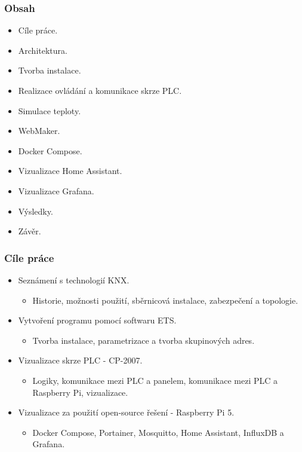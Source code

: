 \documentclass[%
  12pt,       				%
	t,                  %
	aspectratio=1610,   %
	unicode,						%
]{beamer}				    	%
\begin{document}
\disablenavigationsymbols

\maketitle

\begin{frame} 
	\frametitle{Obsah}
	\begin{itemize}
			\item Cíle práce.
			\item Architektura.
			\item Tvorba instalace.
			\item Realizace ovládání a komunikace skrze PLC.
			\item Simulace teploty.
			\item WebMaker.
			\item Docker Compose.
			\item Vizualizace Home Assistant.
			\item Vizualizace Grafana.
			\item Výsledky.
			\item Závěr.
	\end{itemize}
\end{frame}

\begin{frame} 
	\frametitle{Cíle práce}
	\begin{itemize}
			\item Seznámení s technologií KNX.
			\begin{itemize}
				\item Historie, možnosti použití, sběrnicová instalace, zabezpečení a topologie.
			\end{itemize}
			\item Vytvoření programu pomocí softwaru ETS.
			\begin{itemize}
				\item Tvorba instalace, parametrizace a tvorba skupinových adres.
			\end{itemize}
			\item Vizualizace skrze PLC - CP-2007.
			\begin{itemize}
				\item Logiky, komunikace mezi PLC a panelem, komunikace mezi PLC a Raspberry Pi, vizualizace.
			\end{itemize}
			\item Vizualizace za použití open-source řešení - Raspberry Pi 5.
			\begin{itemize}
				\item Docker Compose, Portainer, Mosquitto, Home Assistant, InfluxDB a Grafana.
			\end{itemize}
	\end{itemize}
\end{frame}
\end{document}
